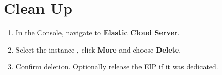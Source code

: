 \documentclass[english]{labguide}
\begin{document}
\section{Clean Up}

\begin{objetivos}
\end{objetivos}

\passoapasso
\begin{enumerate}
  \item In the Console, navigate to \textbf{Elastic Cloud Server}.
  \item Select the instance , click \textbf{More} and
        choose \textbf{Delete}.
  \item Confirm deletion. Optionally release the EIP if it was dedicated.
\end{enumerate}

\end{document}
